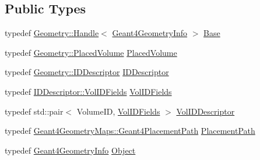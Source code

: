 \subsection*{Public Types}
\begin{DoxyCompactItemize}
\item 
typedef \hyperlink{class_d_d4hep_1_1_handle}{Geometry\+::\+Handle}$<$ \hyperlink{class_d_d4hep_1_1_simulation_1_1_geant4_geometry_info}{Geant4\+Geometry\+Info} $>$ \hyperlink{class_d_d4hep_1_1_simulation_1_1_geant4_volume_manager_a7c19ae032d35b5c68d35029f28fc1586}{Base}
\item 
typedef \hyperlink{class_d_d4hep_1_1_geometry_1_1_placed_volume}{Geometry\+::\+Placed\+Volume} \hyperlink{class_d_d4hep_1_1_simulation_1_1_geant4_volume_manager_a5303c9cd0941b91ab010074947517bd6}{Placed\+Volume}
\item 
typedef \hyperlink{class_d_d4hep_1_1_geometry_1_1_i_d_descriptor}{Geometry\+::\+I\+D\+Descriptor} \hyperlink{class_d_d4hep_1_1_simulation_1_1_geant4_volume_manager_af539708bee7b18130b2052cb92da0822}{I\+D\+Descriptor}
\item 
typedef \hyperlink{class_d_d4hep_1_1_geometry_1_1_i_d_descriptor_a6c4700a96f3a202eedaa25e54d5695ff}{I\+D\+Descriptor\+::\+Vol\+I\+D\+Fields} \hyperlink{class_d_d4hep_1_1_simulation_1_1_geant4_volume_manager_ae80cafd25a138d7c91c24cda4bc350b1}{Vol\+I\+D\+Fields}
\item 
typedef std\+::pair$<$ Volume\+ID, \hyperlink{class_d_d4hep_1_1_simulation_1_1_geant4_volume_manager_ae80cafd25a138d7c91c24cda4bc350b1}{Vol\+I\+D\+Fields} $>$ \hyperlink{class_d_d4hep_1_1_simulation_1_1_geant4_volume_manager_aeedd11a516f671331ec2a46f5d39768d}{Vol\+I\+D\+Descriptor}
\item 
typedef \hyperlink{namespace_d_d4hep_1_1_simulation_1_1_geant4_geometry_maps_a8a325934adb143cb1cbc47dd030395ed}{Geant4\+Geometry\+Maps\+::\+Geant4\+Placement\+Path} \hyperlink{class_d_d4hep_1_1_simulation_1_1_geant4_volume_manager_a990d8577e764541c4914263db1c6b0ca}{Placement\+Path}
\item 
typedef \hyperlink{class_d_d4hep_1_1_simulation_1_1_geant4_geometry_info}{Geant4\+Geometry\+Info} \hyperlink{class_d_d4hep_1_1_simulation_1_1_geant4_volume_manager_a0c6cb7e6e021022e0b22937e5fb6e009}{Object}
\end{DoxyCompactItemize}
